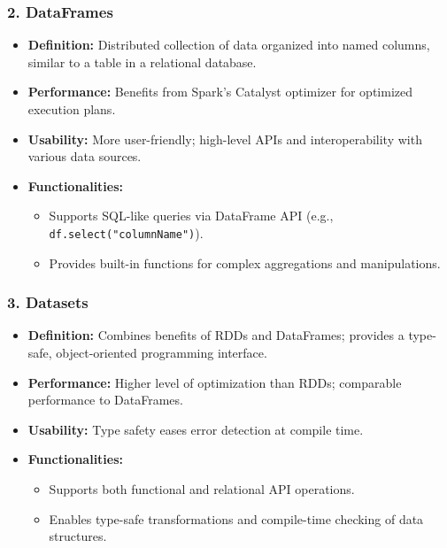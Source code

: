 \documentclass[aspectratio=169]{beamer}
\begin{document}
\begin{frame}[fragile]
    \frametitle{2. DataFrames}
    \begin{itemize}
        \item \textbf{Definition:} Distributed collection of data organized into named columns, similar to a table in a relational database.
        \item \textbf{Performance:} Benefits from Spark’s Catalyst optimizer for optimized execution plans.
        \item \textbf{Usability:} More user-friendly; high-level APIs and interoperability with various data sources.
        \item \textbf{Functionalities:}
            \begin{itemize}
                \item Supports SQL-like queries via DataFrame API (e.g., \texttt{df.select("columnName")}).
                \item Provides built-in functions for complex aggregations and manipulations.
            \end{itemize}
    \end{itemize}
\end{frame}

\begin{frame}[fragile]
    \frametitle{3. Datasets}
    \begin{itemize}
        \item \textbf{Definition:} Combines benefits of RDDs and DataFrames; provides a type-safe, object-oriented programming interface.
        \item \textbf{Performance:} Higher level of optimization than RDDs; comparable performance to DataFrames.
        \item \textbf{Usability:} Type safety eases error detection at compile time.
        \item \textbf{Functionalities:}
            \begin{itemize}
                \item Supports both functional and relational API operations.
                \item Enables type-safe transformations and compile-time checking of data structures.
            \end{itemize}
    \end{itemize}
\end{frame}
\end{document}
